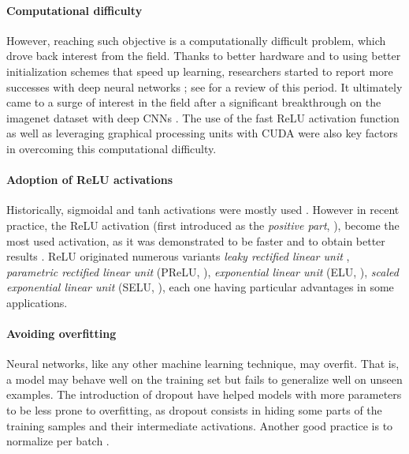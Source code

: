 \paragraph{Computational difficulty}
However, reaching such objective is a computationally difficult problem, which drove back interest from the field. Thanks to better hardware and to using better initialization schemes that speed up learning, researchers started to report more successes with deep neural networks \citep{hinton2006fast,glorot2010understanding} ; see \citep{bengio2009learning} for a review of this period. It ultimately came to a surge of interest in the field after a significant breakthrough on the imagenet dataset \citep{deng2009imagenet} with deep CNNs \citep{krizhevsky2012imagenet}. The use of the fast ReLU activation function \citep{glorot2011deep} as well as leveraging graphical processing units with CUDA \citep{nickolls2008scalable} were also key factors in overcoming this computational difficulty.

\paragraph{Adoption of ReLU activations}
Historically, sigmoidal and tanh activations were mostly used \citep{cybenko1989approximation, lecun1989backpropagation}. However in recent practice, the ReLU activation (first introduced as the \emph{positive part}, \cite{jarrett2009best}), become the most used activation, as it was demonstrated to be faster and to obtain better results \citep{glorot2011deep}. ReLU originated numerous variants \eg \emph{leaky rectified linear unit} \citep{maas2013rectifier}, \emph{parametric rectified linear unit} (PReLU, \cite{he2015delving}), \emph{exponential linear unit} (ELU, \cite{clevert2015fast}), \emph{scaled exponential linear unit} (SELU, \cite{Klambauer2017self}), each one having particular advantages in some applications.

\paragraph{Avoiding overfitting}
Neural networks, like any other machine learning technique, may overfit. That is, a model may behave well on the training set but fails to generalize well on unseen examples. The introduction of dropout \citep{srivastava2014dropout} have helped models with more parameters to be less prone to overfitting, as dropout consists in hiding some parts of the training samples and their intermediate activations. Another good practice is to normalize per batch \citep{ioffe2015batch}.

